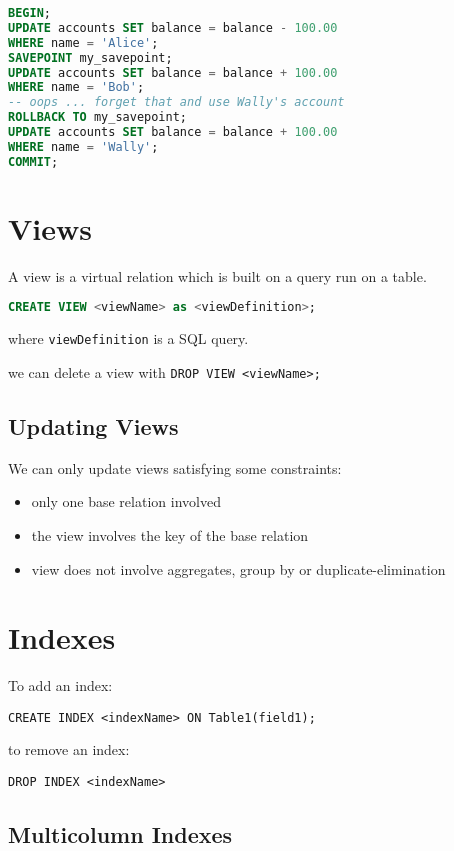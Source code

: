 \documentclass{article}
\renewcommand{\t}[1]{\texttt{#1}}
\begin{document}
\begin{lstlisting}[language=SQL]
BEGIN;
UPDATE accounts SET balance = balance - 100.00
WHERE name = 'Alice';
SAVEPOINT my_savepoint;
UPDATE accounts SET balance = balance + 100.00
WHERE name = 'Bob';
-- oops ... forget that and use Wally's account
ROLLBACK TO my_savepoint;
UPDATE accounts SET balance = balance + 100.00
WHERE name = 'Wally';
COMMIT;

\end{lstlisting}


\section*{Views}

A view is a virtual relation which is built on a query run on a table. 
\begin{lstlisting}[language=SQL]
CREATE VIEW <viewName> as <viewDefinition>;
\end{lstlisting}
where \t{viewDefinition} is a SQL query.

we can delete a view with \t{DROP VIEW <viewName>;}

\subsection*{Updating Views}

We can only update views satisfying some constraints:
\begin{itemize}
	\item only one base relation involved
	\item the view involves the key of the base relation
	\item view does not involve aggregates, group by or duplicate-elimination
\end{itemize}


\section*{Indexes}

To add an index:

\t{CREATE INDEX <indexName> ON Table1(field1);}

to remove an index:

\t{DROP INDEX <indexName>}

\subsection*{Multicolumn Indexes}
\end{document}
